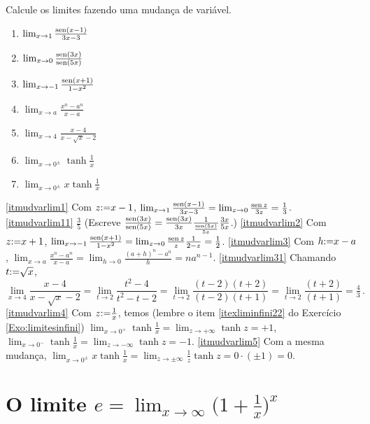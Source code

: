 \begin{exo}\label{Exo:mudvarlimites}
Calcule os limites fazendo uma mudança de variável.
\begin{multicols}{3}
\begin{enumerate}
\item\label{itmudvarlim1} $\lim_{x\to 1}\frac{\operatorname{sen} (x-1)}{3x-3}$
\item\label{itmudvarlim11} $\lim_{x\to 0}\frac{\operatorname{sen} (3x)}{\operatorname{sen} (5x)}$
\item\label{itmudvarlim2} $\lim_{x\to -1}\frac{\operatorname{sen}(x+1)}{1-x^2}$
\item\label{itmudvarlim3} $\lim_{x\to a}\frac{x^n-a^n}{x-a}$
\item\label{itmudvarlim31} $\lim_{x\to 4}\frac{x-4}{x-\sqrt{x}-2}$
\item\label{itmudvarlim4} $\lim_{x\to 0^{\pm}}\tanh \frac{1}{x}$
\item\label{itmudvarlim5} $\lim_{x\to 0^{\pm}}x\tanh \frac{1}{x}$
\end{enumerate}
\end{multicols}
\vspace{0.01cm}
\begin{sol}
\eqref{itmudvarlim1} Com $z{:=} x-1$, $\lim_{x\to 1}\frac{\operatorname{sen}
(x-1)}{3x-3}=\lim_{z\to 0}\frac{\operatorname{sen}
z}{3z}=\frac13$.
\eqref{itmudvarlim11} $\frac35$ (Escreve $\frac{\operatorname{sen} (3x)}{\operatorname{sen} (5x)}=\frac{\operatorname{sen} (3x)}{3x}\frac{1}{\frac{\operatorname{sen} (5x)}{5x}}\frac{3x}{5x}$.) 
\eqref{itmudvarlim2} Com $z{:=} x+1$, $\lim_{x\to
-1}\frac{\operatorname{sen}(x+1)}{1-x^2}=\lim_{z\to
0}\frac{\operatorname{sen} z}{z}\frac{1}{2-z}=\frac12$.
\eqref{itmudvarlim3} Com $h{:=} x-a$, 
$\lim_{x\to a}\frac{x^n-a^n}{x-a}=\lim_{h\to
0}\frac{(a+h)^n-a^n}{h}=na^{n-1}$.
\eqref{itmudvarlim31} Chamando $t{:=} \sqrt{x}$, 
$$\lim_{x\to 4}\frac{x-4}{x-\sqrt{x}-2}=\lim_{t\to 2}\frac{t^2-4}{t^2-t-2}=\lim_{t\to 2}\frac{(t-2)(t+2)}{(t-2)(t+1)}=\lim_{t\to 2}\frac{(t+2)}{(t+1)}=\tfrac43\,.$$
\eqref{itmudvarlim4} Com $z{:=} \frac{1}{x}$, temos (lembre o
item \eqref{itexliminfini22} do Exercício \ref{Exo:limitesinfini})
 $\lim_{x\to 0^+}\tanh \frac{1}{x}=\lim_{z\to +\infty}\tanh z=+1$,
$\lim_{x\to 0^-}\tanh \frac{1}{x}=\lim_{z\to -\infty}\tanh z=-1$.
\eqref{itmudvarlim5} Com a mesma mudança,
$\lim_{x\to 0^\pm}x\tanh \frac{1}{x}=\lim_{z\to \pm
\infty}\frac{1}{z}\tanh{z}=0\cdot (\pm 1)=0$.
\end{sol}
\end{exo}

\section{O limite $e=\lim_{x\to
\infty}\bigl(1+\tfrac1x\bigr)^x$}\label{Sec:Fundam_numero_e}

